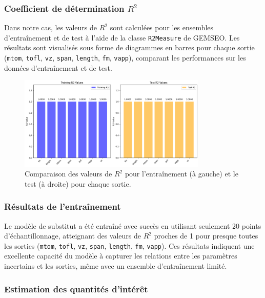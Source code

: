 \documentclass[a4paper, 11pt]{article}
\begin{document}
\subsubsection{Coefficient de détermination \( R^2 \)}

Dans notre cas, les valeurs de \( R^2 \) sont calculées pour les ensembles d’entraînement et de test à l’aide de la classe \texttt{R2Measure} de GEMSEO. Les résultats sont visualisés sous forme de diagrammes en barres pour chaque sortie (\texttt{mtom}, \texttt{tofl}, \texttt{vz}, \texttt{span}, \texttt{length}, \texttt{fm}, \texttt{vapp}), comparant les performances sur les données d’entraînement et de test.

\begin{figure}[H]
    \centering
    \includegraphics[width=0.8\textwidth]{Images_Ayoub/Problem2/UseCase1/Surrogate/R2/R2.png}
    \caption{Comparaison des valeurs de \( R^2 \) pour l’entraînement (à gauche) et le test (à droite) pour chaque sortie.}
    \label{fig:r2_plot}
\end{figure}

\subsubsection{Résultats de l’entraînement}
Le modèle de substitut a été entraîné avec succès en utilisant seulement 20 points d’échantillonnage, atteignant des valeurs de \( R^2 \) proches de 1 pour presque toutes les sorties (\texttt{mtom}, \texttt{tofl}, \texttt{vz}, \texttt{span}, \texttt{length}, \texttt{fm}, \texttt{vapp}). Ces résultats indiquent une excellente capacité du modèle à capturer les relations entre les paramètres incertains et les sorties, même avec un ensemble d’entraînement limité.


\subsubsection{Estimation des quantités d’intérêt}
\end{document}
